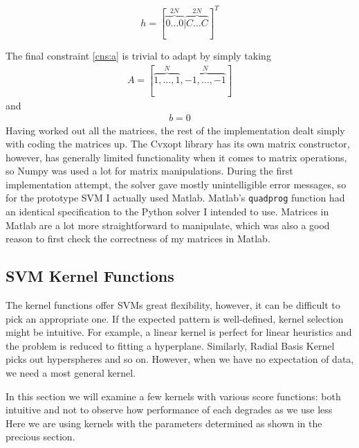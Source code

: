 \documentclass[12pt,notitlepage,twoside]{scrreprt}
\begin{document}
\[h = [\overbrace{0 \dots 0}^{2N}|\overbrace{C \dots C}^{2N}]^T\]

The final constraint \ref{cns:a} is trivial to adapt by simply taking 
\begin{gather*}
A=[\overbrace{1,\dots,1}^N,\overbrace{-1,\dots,-1}^N]
\end{gather*}
and
\begin{gather*}
b=0
\end{gather*}
Having worked out all the matrices, the rest of the implementation dealt simply
with coding the matrices up. The Cvxopt library has its own matrix constructor,
however, has generally limited functionality when it comes to matrix
operations, so Numpy was used a lot for matrix manipulations. During the first
implementation attempt, the solver gave mostly unintelligible error messages,
so for the prototype SVM I actually used Matlab. Matlab's \texttt{quadprog}
function had an identical specification to the Python solver I intended to use.
Matrices in Matlab are a lot more straightforward to manipulate, which was also
a good reason to first check the correctness of my matrices in Matlab.

\subsection{SVM Kernel Functions}
The kernel functions offer SVMs great flexibility, however, it can be difficult to pick an
appropriate one. If the expected pattern is well-defined, kernel selection might be
intuitive. For example, a linear kernel is perfect for linear heuristics and the problem
is reduced to fitting a hyperplane.  Similarly, Radial Basis Kernel picks out hyperspheres
and so on. However, when we have no expectation of data, we need a most general kernel.

In this section we will examine a few kernels with various score functions: both intuitive
and not to observe how performance of each degrades as we use less 
Here we are using kernels with the parameters determined as shown in the precious section.
\end{document}

